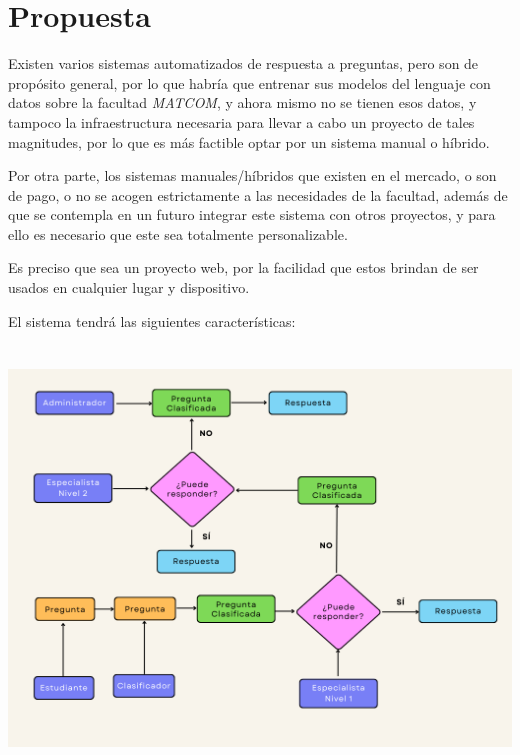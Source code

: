\chapter{Propuesta}\label{chapter:proposal}

Existen varios sistemas automatizados de respuesta a preguntas, pero son de propósito general, por lo que habría que entrenar sus modelos del lenguaje con datos sobre la facultad \textit{MATCOM}, y ahora mismo no se tienen esos datos, y tampoco la infraestructura necesaria para llevar a cabo un proyecto de tales magnitudes, por lo que es más factible optar por un sistema manual o híbrido.
\newline

Por otra parte, los sistemas manuales/híbridos que existen en el mercado, o son de pago, o no se acogen estrictamente a las necesidades de la facultad, además de que se contempla en un futuro integrar este sistema con otros proyectos, y para ello es necesario que este sea totalmente personalizable.
\newline

Es preciso que sea un proyecto web, por la facilidad que estos brindan de ser usados en cualquier lugar y dispositivo.
\newline

El sistema tendrá las siguientes características:
\newline

\includegraphics[width=15cm, height=11.25cm]{thesis_diagram.png}

